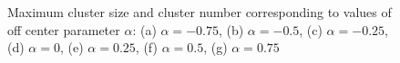 \documentclass[../../master_thesis_np.tex]{subfiles}
\begin{document}
			\begin{figure}[t]
				\ContinuedFloat
				\centering
			
			\caption{Maximum cluster size and cluster number corresponding to values of off center parameter $\alpha$: (a) $\alpha = -0.75$, (b) $\alpha = -0.5$, (c) $\alpha = -0.25$, (d) $\alpha = 0$, (e) $\alpha = 0.25$, (f) $\alpha = 0.5$, (g) $\alpha = 0.75$}
			\label{fig:lj_oc_clust}
		\end{figure}
		
\end{document}
